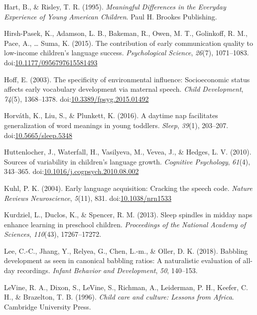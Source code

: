 \documentclass[,man,floatsintext]{apa6}
\begin{document}
\hypertarget{ref-hart1995meaningful}{}
Hart, B., \& Risley, T. R. (1995). \emph{Meaningful Differences in the
Everyday Experience of Young American Children}. Paul H. Brookes
Publishing.

\hypertarget{ref-hirshpasek2015contribution}{}
Hirsh-Pasek, K., Adamson, L. B., Bakeman, R., Owen, M. T., Golinkoff, R.
M., Pace, A., \ldots{} Suma, K. (2015). The contribution of early
communication quality to low-income children's language success.
\emph{Psychological Science}, \emph{26}(7), 1071--1083.
doi:\href{https://doi.org/10.1177/0956797615581493}{10.1177/0956797615581493}

\hypertarget{ref-hoff2003specificity}{}
Hoff, E. (2003). The specificity of environmental influence:
Socioeconomic status affects early vocabulary development via maternal
speech. \emph{Child Development}, \emph{74}(5), 1368--1378.
doi:\href{https://doi.org/10.3389/fpsyg.2015.01492}{10.3389/fpsyg.2015.01492}

\hypertarget{ref-horvath2016daytime}{}
Horváth, K., Liu, S., \& Plunkett, K. (2016). A daytime nap facilitates
generalization of word meanings in young toddlers. \emph{Sleep},
\emph{39}(1), 203--207.
doi:\href{https://doi.org/10.5665/sleep.5348}{10.5665/sleep.5348}

\hypertarget{ref-huttenlocher2010sources}{}
Huttenlocher, J., Waterfall, H., Vasilyeva, M., Vevea, J., \& Hedges, L.
V. (2010). Sources of variability in children's language growth.
\emph{Cognitive Psychology}, \emph{61}(4), 343--365.
doi:\href{https://doi.org/10.1016/j.cogpsych.2010.08.002}{10.1016/j.cogpsych.2010.08.002}

\hypertarget{ref-kuhl2004early}{}
Kuhl, P. K. (2004). Early language acquisition: Cracking the speech
code. \emph{Nature Reviews Neuroscience}, \emph{5}(11), 831.
doi:\href{https://doi.org/10.1038/nrn1533}{10.1038/nrn1533}

\hypertarget{ref-kurdziel2013sleep}{}
Kurdziel, L., Duclos, K., \& Spencer, R. M. (2013). Sleep spindles in
midday naps enhance learning in preschool children. \emph{Proceedings of
the National Academy of Sciences}, \emph{110}(43), 17267--17272.

\hypertarget{ref-lee2018babbling}{}
Lee, C.-C., Jhang, Y., Relyea, G., Chen, L.-m., \& Oller, D. K. (2018).
Babbling development as seen in canonical babbling ratios: A
naturalistic evaluation of all-day recordings. \emph{Infant Behavior and
Development}, \emph{50}, 140--153.

\hypertarget{ref-levine1996child}{}
LeVine, R. A., Dixon, S., LeVine, S., Richman, A., Leiderman, P. H.,
Keefer, C. H., \& Brazelton, T. B. (1996). \emph{Child care and culture:
Lessons from Africa}. Cambridge University Press.
\end{document}

